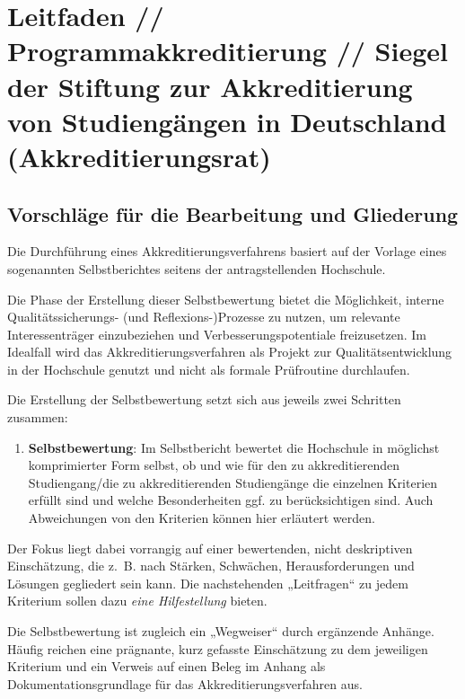 \chapter{Leitfaden // Programmakkreditierung // Siegel der Stiftung zur
Akkreditierung von Studiengängen in Deutschland (Akkreditierungsrat)}\label{Leitfaden // Programmakkreditierung // Siegel der Stiftung zur
Akkreditierung von Studiengängen in Deutschland (Akkreditierungsrat)}


\section{Vorschläge für die Bearbeitung und
Gliederung}\label{vorschluxe4ge-fuxfcr-die-bearbeitung-und-gliederung}

Die Durchführung eines Akkreditierungsverfahrens basiert auf der Vorlage
eines sogenannten Selbstberichtes seitens der antragstellenden
Hochschule.

Die Phase der Erstellung dieser Selbstbewertung bietet die Möglichkeit,
interne Qualitätssicherungs- (und Reflexions-)Prozesse zu nutzen, um
relevante Interessenträger einzubeziehen und Verbesserungspotentiale
freizusetzen. Im Idealfall wird das Akkreditierungsverfahren als Projekt
zur Qualitätsentwicklung in der Hochschule genutzt und nicht als formale
Prüfroutine durchlaufen.

Die Erstellung der Selbstbewertung setzt sich aus jeweils zwei Schritten
zusammen:

\begin{enumerate}
\def\labelenumi{\arabic{enumi}.}
\tightlist
\item
  \textbf{Selbstbewertung}: Im Selbstbericht bewertet die Hochschule in
  möglichst komprimierter Form selbst, ob und wie für den zu
  akkreditierenden Studiengang/die zu akkreditierenden Studiengänge die
  einzelnen Kriterien erfüllt sind und welche Besonderheiten ggf. zu
  berücksichtigen sind. Auch Abweichungen von den Kriterien können hier
  erläutert werden.
\end{enumerate}

Der Fokus liegt dabei vorrangig auf einer bewertenden, nicht
deskriptiven Einschätzung, die z.~B. nach Stärken, Schwächen,
Herausforderungen und Lösungen gegliedert sein kann. Die nachstehenden
„Leitfragen`` zu jedem Kriterium sollen dazu \emph{eine Hilfestellung}
bieten.

Die Selbstbewertung ist zugleich ein „Wegweiser`` durch ergänzende
Anhänge. Häufig reichen eine prägnante, kurz gefasste Einschätzung zu
dem jeweiligen Kriterium und ein Verweis auf einen Beleg im Anhang als
Dokumentationsgrundlage für das Akkreditierungsverfahren aus.

